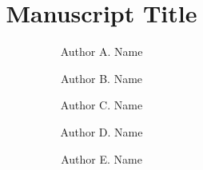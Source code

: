 \documentclass[ASNA,twocolumn]{USG} %
\begin{document}
\title{Manuscript Title}
\author[1]{Author A. Name}
\author[2]{Author B. Name}
\author[3]{Author C. Name}
\author[4]{Author D. Name}
\author[2]{Author E. Name}





















\end{document}
